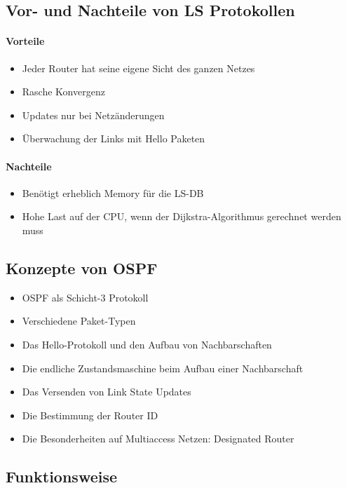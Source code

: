 \documentclass[a4paper,12pt]{article}
\begin{document}
\subsection{Vor- und Nachteile von LS Protokollen}

\paragraph{Vorteile}
\begin{itemize}
\item Jeder Router hat seine eigene Sicht des ganzen Netzes
\item Rasche Konvergenz
\item Updates nur bei Netzänderungen
\item Überwachung der Links mit Hello Paketen
\end{itemize}

\paragraph{Nachteile}
\begin{itemize}
\item Benötigt erheblich Memory für die LS-DB
\item Hohe Last auf der CPU, wenn der Dijkstra-Algorithmus gerechnet werden muss
\end{itemize}

\subsection{Konzepte von OSPF}
\begin{itemize}
\item OSPF als Schicht-3 Protokoll
\item Verschiedene Paket-Typen
\item Das Hello-Protokoll und den Aufbau von Nachbarschaften
\item Die endliche Zustandsmaschine beim Aufbau einer Nachbarschaft
\item Das Versenden von Link State Updates
\item Die Bestimmung der Router ID
\item Die Besonderheiten auf Multiaccess Netzen: Designated Router
\end{itemize}

\subsection{Funktionsweise}
\end{document}
